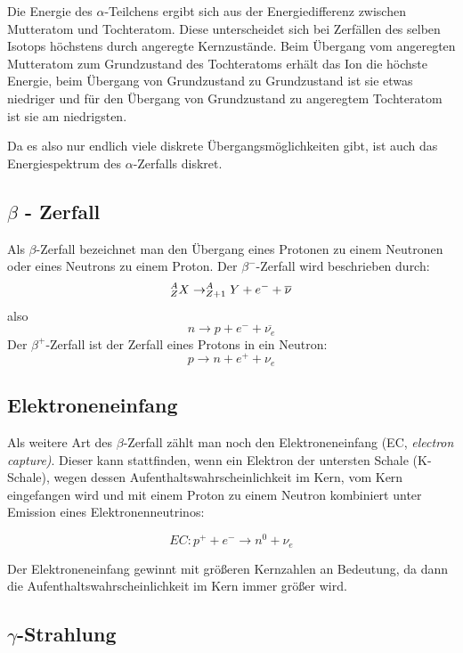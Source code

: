 Die Energie des $\alpha$-Teilchens ergibt sich aus der Energiedifferenz zwischen Mutteratom und Tochteratom. Diese unterscheidet sich bei Zerfällen des selben Isotops höchstens durch angeregte Kernzustände. Beim Übergang vom angeregten Mutteratom zum Grundzustand des Tochteratoms erhält das Ion die höchste Energie, beim Übergang von Grundzustand zu Grundzustand ist sie etwas niedriger und für den Übergang von Grundzustand zu angeregtem Tochteratom ist sie am niedrigsten.

Da es also nur endlich viele diskrete Übergangsmöglichkeiten gibt, ist auch das Energiespektrum des $\alpha$-Zerfalls diskret.  

\subsection{$\beta$ - Zerfall}
Als $\beta$-Zerfall bezeichnet man den Übergang eines Protonen zu einem Neutronen oder eines Neutrons zu einem Proton. Der $\beta^-$-Zerfall wird beschrieben durch:
$$ ^{A}_{Z}{X} \rightarrow ^{A}_{Z+1}{Y} + e^- + \overline{\nu} $$
also
$$ n \rightarrow p + e^- + \overline{\nu_e} $$
Der $\beta^+$-Zerfall ist der Zerfall eines Protons in ein Neutron:
$$p \rightarrow n + e^+ + \nu_e$$

\subsection{Elektroneneinfang}

Als weitere Art des $\beta$-Zerfall zählt man noch den Elektroneneinfang (EC, \emph{electron capture)}. Dieser kann stattfinden, wenn ein Elektron der untersten Schale (K-Schale), wegen dessen Aufenthaltswahrscheinlichkeit im Kern, vom Kern eingefangen wird und mit einem Proton zu einem Neutron kombiniert unter Emission eines Elektronenneutrinos:

$$ EC: p^+ + e^- \rightarrow n^0 + \nu_e $$

Der Elektroneneinfang gewinnt mit größeren Kernzahlen an Bedeutung, da dann die Aufenthaltswahrscheinlichkeit im Kern immer größer wird.


\subsection{$\gamma$-Strahlung}

